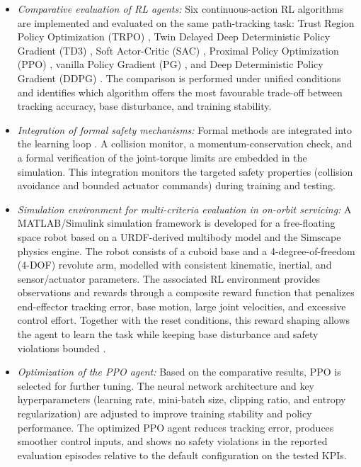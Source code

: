 \documentclass{ieeeaccess}
\begin{document}
\begin{itemize}
  \item \textit{Comparative evaluation of RL agents:} Six continuous-action RL algorithms are implemented and evaluated on the same path-tracking task: Trust Region Policy Optimization (TRPO) \cite{b14}, Twin Delayed Deep
Deterministic Policy Gradient (TD3) \cite{b17}, Soft Actor-Critic (SAC) \cite{b18}, Proximal Policy Optimization
(PPO) \cite{b15}, vanilla Policy Gradient (PG) \cite{b21}, and Deep Deterministic Policy Gradient (DDPG) \cite{b7}. The comparison is performed under unified conditions and identifies which algorithm offers the most favourable trade-off between tracking accuracy, base disturbance, and training stability.
  \item \textit{Integration of formal safety mechanisms:} Formal methods are integrated into the learning loop \cite{b5, b6, b22, b23}. A collision monitor, a momentum-conservation check, and a formal verification of the joint-torque limits are embedded in the simulation. This integration monitors the targeted safety properties (collision avoidance and bounded actuator commands) during training and testing.
 \item \textit{Simulation environment for multi-criteria evaluation in on-orbit servicing:} A MATLAB/Simulink simulation framework is developed for a free-floating space robot based on a URDF-derived multibody model and the Simscape physics engine. The robot consists of a cuboid base and a 4-degree-of-freedom (4-DOF) revolute arm, modelled with consistent kinematic, inertial, and sensor/actuator parameters. The associated RL environment provides observations and rewards through a composite reward function that penalizes end-effector tracking error, base motion, large joint velocities, and excessive control effort. Together with the reset conditions, this reward shaping allows the agent to learn the task while keeping base disturbance and safety violations bounded \cite{b25,b26,b27,b28,b7}.
 \item \textit{Optimization of the PPO agent:} Based on the comparative results, PPO is selected for further tuning. The neural network architecture and key hyperparameters (learning rate, mini-batch size, clipping ratio, and entropy regularization) are adjusted to improve training stability and policy performance. The optimized PPO agent reduces tracking error, produces smoother control inputs, and shows no safety violations in the reported evaluation episodes relative to the default configuration on the tested KPIs.
\end{itemize}
\end{document}
